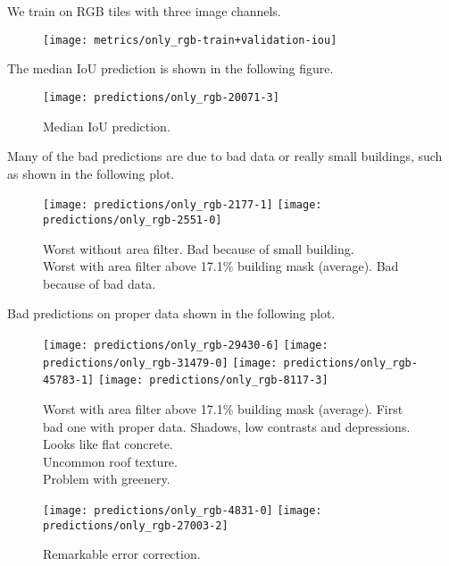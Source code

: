 We train on RGB tiles with three image channels.

\begin{figure}[H]
  \centering
  \texttt{[image: metrics/only\_rgb-train+validation-iou]}
\end{figure}

The median IoU prediction is shown in the following figure.

\begin{figure}[H]
  \centering
  \texttt{[image: predictions/only\_rgb-20071-3]}  %
  \caption{%
    Median IoU prediction.
  }
\end{figure}

Many of the bad predictions are due to bad data or really small buildings, such as shown in the following plot.

\begin{figure}[H]
  \centering
  \texttt{[image: predictions/only\_rgb-2177-1]}  %
  \texttt{[image: predictions/only\_rgb-2551-0]}  %
  \caption{%
    Worst without area filter. Bad because of small building. \\
    Worst with area filter above 17.1\% building mask (average).
    Bad because of bad data.
  }
\end{figure}

Bad predictions on proper data shown in the following plot.

\begin{figure}[H]
  \centering
  \texttt{[image: predictions/only\_rgb-29430-6]}  %
  \texttt{[image: predictions/only\_rgb-31479-0]}  %
  \texttt{[image: predictions/only\_rgb-45783-1]}  %
  \texttt{[image: predictions/only\_rgb-8117-3]}  %
  \caption{%
    Worst with area filter above 17.1\% building mask (average).  First bad one with proper data.  Shadows, low contrasts and depressions. \\
    Looks like flat concrete. \\
    Uncommon roof texture. \\
    Problem with greenery.
  }
\end{figure}

\begin{figure}[H]
  \centering
  \texttt{[image: predictions/only\_rgb-4831-0]}  %
  \texttt{[image: predictions/only\_rgb-27003-2]}  %
  \caption{%
    Remarkable error correction. \\
  }
\end{figure}
